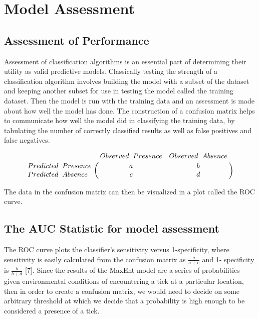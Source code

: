 \section{Model Assessment }  %

\subsection{Assessment of Performance }

Assessment of classification algorithms is an essential part of determining their utility as valid predictive models. Classically testing the strength of a classification algorithm involves building the model with a subset of the dataset and keeping another subset for use in testing the model called the training dataset. Then the model is run with the training data and an assessment is made about how well the model has done. The construction of a confusion matrix helps to communicate how well the model did in classifying the training data, by tabulating the number of correctly classified results as well as false positives and false negatives. 

\begin{equation} \bordermatrix{~ & Observed \hspace{0.2cm} Presence & Observed \hspace{0.2cm} Absence \cr
                  Predicted\hspace{0.2cm}  Presence & a & b \cr
                  Predicted \hspace{0.2cm} Absence & c & d \cr} \end{equation}
                  
\noindent The data in the confusion matrix can then be visualized in a plot called the ROC curve. \newline

\subsection{The AUC Statistic for model assessment }
The ROC curve plots the classifier's sensitivity versus 1-specificity, where sensitivity is easily calculated from the confusion matrix as  $\frac{a}{a+c}$ and 1- specificity is $\frac{b}{b+d}$ [7]. Since the results of the MaxEnt model are a series of probabilities given environmental conditions of encountering a tick at a particular location, then in order to create a confusion matrix, we would need to decide on some arbitrary threshold at which we decide that a probability is high enough to be considered a presence of a tick. \newline

